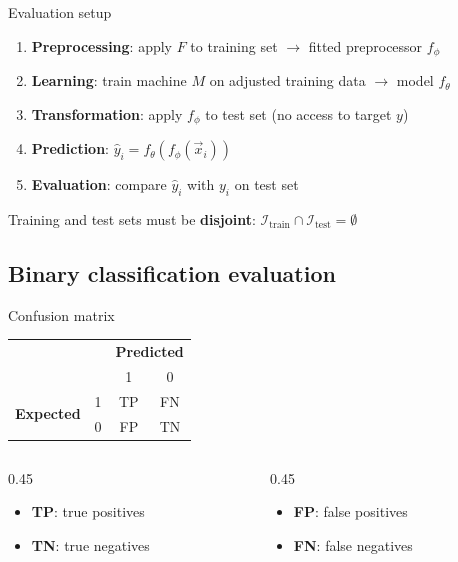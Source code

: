 \begin{frame}{Evaluation setup}
  \begin{enumerate}
    \item \textbf{Preprocessing}: apply $F$ to training set $\to$ fitted
      preprocessor $f_\phi$
    \item \textbf{Learning}: train machine $M$ on adjusted training data $\to$
      model $f_\theta$
    \item \textbf{Transformation}: apply $f_\phi$ to test set (no access to
      target $y$)
    \item \textbf{Prediction}: $\hat{y}_i = f_\theta(f_\phi(\vec{x}_i))$
    \item \textbf{Evaluation}: compare $\hat{y}_i$ with $y_i$ on test set
  \end{enumerate}

  \vspace{0.3cm}
  Training and test sets must be \textbf{disjoint}:
  $\mathcal{I}_\text{train} \cap \mathcal{I}_\text{test} = \emptyset$
\end{frame}

\subsection{Binary classification evaluation}

\begin{frame}{Confusion matrix}
  \centering
  \begin{tabular}{ll|cc}
    \toprule
    & & \multicolumn{2}{c}{\textbf{Predicted}} \\
    & & 1 & 0 \\
    \midrule
    \multirow{2}{*}{\textbf{Expected}} & 1 & TP & FN \\
    & 0 & FP & TN \\
    \bottomrule
  \end{tabular}

  \vspace{0.5cm}
  \raggedright
  \small
  \begin{columns}[T]
    \begin{column}{0.45\textwidth}
      \begin{itemize}
        \item \textbf{TP}: true positives
        \item \textbf{TN}: true negatives
      \end{itemize}
    \end{column}
    \begin{column}{0.45\textwidth}
      \begin{itemize}
        \item \textbf{FP}: false positives
        \item \textbf{FN}: false negatives
      \end{itemize}
    \end{column}
  \end{columns}
\end{frame}

